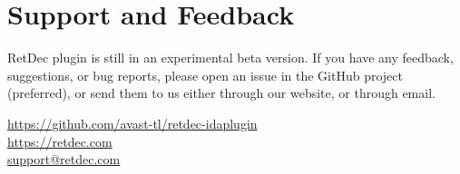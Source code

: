 \documentclass[pdftex, a4paper,12pt, oneside, svgnames]{article}
\begin{document}
\section{Support and Feedback}
\label{sec:support}
RetDec plugin is still in an experimental beta version. If you have any feedback, suggestions, or bug reports, please open an issue in the GitHub project (preferred), or send them to us either through our website, or through email.
\begin{center}
{
\LARGE
\href{https://github.com/avast-tl/retdec-idaplugin}{https://github.com/avast-tl/retdec-idaplugin} \\[5 mm]
\href{https://retdec.com}{https://retdec.com} \\[5 mm]
\href{mailto:support@retdec.com}{support@retdec.com}
}
\end{center}

\end{document}
